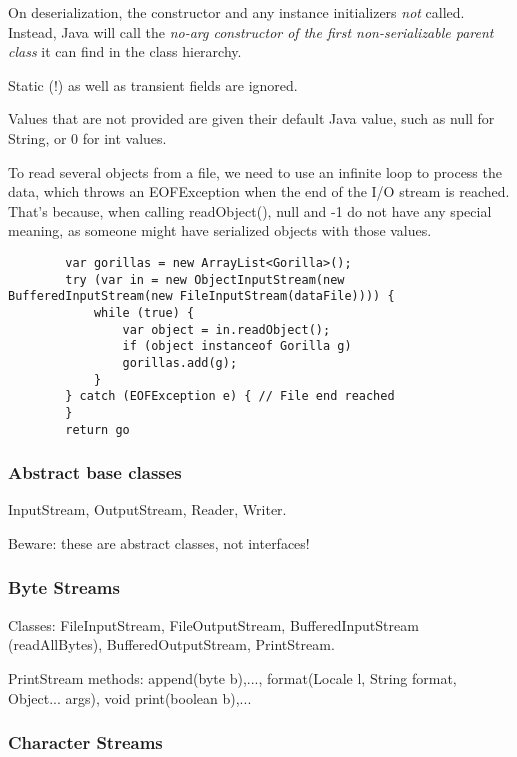 \documentclass{scrartcl}
\begin{document}
    On deserialization, the constructor and any instance initializers \textit{not} called.
    Instead, Java will call the \textit{no-­arg constructor of the first non-serializable parent class} it can find in the class hierarchy.

    Static (!) as well as transient fields are ignored.

    Values that are not provided are  given their default Java value, such as null for String, or 0 for int values.

    To read several objects from a file, we need to use an infinite loop to process the data,
    which throws an EOFException when the end of the I/O stream is reached. That's because, when calling readObject(), null and -­1 do not have any special meaning,
    as someone might have serialized objects with those values.

    \begin{lstlisting}
        var gorillas = new ArrayList<Gorilla>();
        try (var in = new ObjectInputStream(new BufferedInputStream(new FileInputStream(dataFile)))) {
            while (true) {
                var object = in.readObject();
                if (object instanceof Gorilla g)
                gorillas.add(g);
            }
        } catch (EOFException e) { // File end reached
        }
        return go
    \end{lstlisting}

\subsubsection{Abstract base classes}

    InputStream, OutputStream, Reader, Writer.

    Beware: these are abstract classes, not interfaces!

\subsubsection{Byte Streams}

    Classes: FileInputStream, FileOutputStream, BufferedInputStream (readAllBytes), BufferedOutputStream, PrintStream.

    PrintStream methods: append(byte b),..., format(Locale l, String format, Object... args), void print(boolean b),...

\subsubsection{Character Streams}
\end{document}

